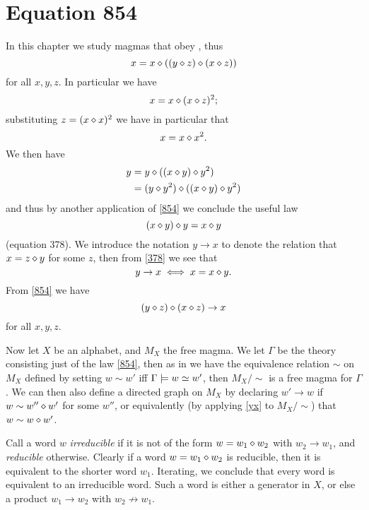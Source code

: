 \chapter{Equation 854}\label{854-chapter}

In this chapter we study magmas that obey , thus
\begin{equation}\label{854}
  x = x \diamond ((y \diamond z) \diamond (x \diamond z))
\end{equation}
for all $x,y,z$.  In particular we have
$$ x = x \diamond (x \diamond z)^2;$$
substituting $z  = (x \diamond x)^2$ we have in particular that
\begin{equation}\label{8}
  x = x \diamond x^2.
\end{equation}
We then have
\begin{align*}
  y &= y \diamond ((x \diamond y) \diamond y^2) \\
  & = (y \diamond y^2) \diamond ((x \diamond y) \diamond y^2)
\end{align*}
and thus by another application of \eqref{854} we conclude the useful law
\begin{equation}\label{378}
   (x \diamond y) \diamond y = x \diamond y
\end{equation}
(equation 378).  We introduce the notation $y \to x$ to denote the relation that $x = z \diamond y$ for some $z$, then from \eqref{378} we see that
\begin{equation}\label{yx}
  y \to x \iff x = x \diamond y.
\end{equation}
From \eqref{854} we have
\begin{equation}\label{854-alt}
  (y \diamond z) \diamond (x \diamond z) \to x
\end{equation}
for all $x,y,z$.

Now let $X$ be an alphabet, and $M_X$ the free magma.  We let $\Gamma$ be the theory consisting just of the law \eqref{854}, then as in  we have the equivalence relation $\sim$ on $M_X$ defined by setting $w \sim w'$ iff $\Gamma \models w \simeq w'$, then $M_X/\sim$ is a free magma for $\Gamma$.  We can then also define a directed graph on $M_X$ by declaring $w' \to w$ if $w \sim w'' \diamond w'$ for some $w''$, or equivalently (by applying \eqref{yx} to $M_X/\sim$) that $w \sim w \diamond w'$.

Call a word $w$ \emph{irreducible} if it is not of the form $w = w_1 \diamond w_2$ with $w_2 \to w_1$, and \emph{reducible} otherwise.  Clearly if a word $w = w_1 \diamond w_2$ is reducible, then it is equivalent to the shorter word $w_1$.  Iterating, we conclude that every word is equivalent to an irreducible word.  Such a word is either a generator in $X$, or else a product $w_1 \to w_2$ with $w_2 \not \to w_1$.

